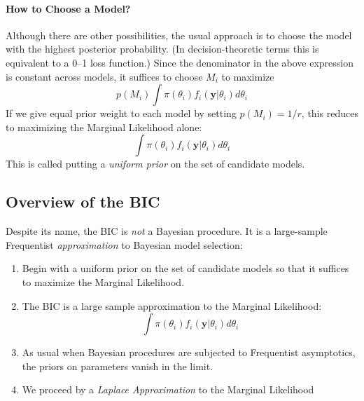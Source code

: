 \documentclass[12pt]{article}
\theoremstyle{definition}
\begin{document}
\paragraph{How to Choose a Model?} Although there are other possibilities, the usual approach is to choose the model with the highest posterior probability. (In decision-theoretic terms this is equivalent to a  0--1 loss function.) Since the denominator in the above expression is constant across models, it suffices to choose $M_i$ to maximize
		$$p(M_i)\int \pi(\theta_i)f_i(\mathbf{y}|\theta_i)d\theta_i$$
If we give equal prior weight to each model by setting $p(M_i) = 1/r$, this reduces to maximizing the Marginal Likelihood alone:
		$$\int \pi(\theta_i)f_i(\mathbf{y}|\theta_i)d\theta_i$$
This is called putting a \emph{uniform prior} on the set of candidate models.	


\subsection{Overview of the BIC}
Despite its name, the BIC is \emph{not} a Bayesian procedure. It is a large-sample Frequentist \emph{approximation} to Bayesian model selection:
	\begin{enumerate}
		\item Begin with a uniform prior on the set of candidate models so that it suffices to maximize the Marginal Likelihood.
		\item The BIC is a large sample approximation to the Marginal Likelihood:
		$$\int \pi(\theta_i)f_i(\mathbf{y}|\theta_i)d\theta_i$$
		\item As usual when Bayesian procedures are subjected to Frequentist asymptotics, the priors on parameters vanish in the limit.
		\item We proceed by a \emph{Laplace Approximation} to the Marginal Likelihood
	\end{enumerate}
\end{document}
